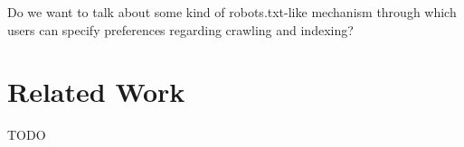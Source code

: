 \documentclass[sigconf,review]{acmart}
\begin{document}
Do we want to talk about some kind of robots.txt-like mechanism through which users can specify preferences regarding crawling and indexing?

\section{Related Work}\label{sec:related-work}





\begin{acks}
TODO
\end{acks}



\end{document}
